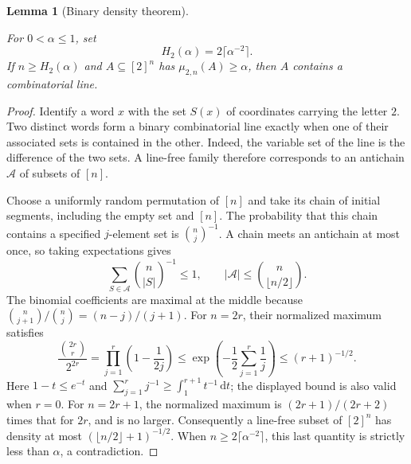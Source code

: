\documentclass[11pt]{amsart}
\newcommand{\dd}{\,\mathrm d}
\newtheorem{lemma}[theorem]{Lemma}
\theoremstyle{definition}
\theoremstyle{remark}
\numberwithin{equation}{section}
\providecommand{\lean}[1]{}
\providecommand{\leanok}{}
\begin{document}
\begin{lemma}[Binary density theorem]\label{cj:binary}
\lean{Auto.C_cj_binary,Auto.cj_binary}
\leanok
For $0<\alpha\le1$, set
\[
 H_2(\alpha)=2\lceil\alpha^{-2}\rceil.
\]
If $n\ge H_2(\alpha)$ and $A\subseteq[2]^n$ has
$\mu_{2,n}(A)\ge\alpha$, then $A$ contains a combinatorial line.
\end{lemma}
\begin{proof}
Identify a word $x$ with the set $S(x)$ of coordinates carrying the
letter $2$.  Two distinct words form a binary combinatorial line
exactly when one of their associated sets is contained in the other.
Indeed, the variable set of the line is the difference of the two
sets.  A line-free family therefore corresponds to an antichain
$\mathcal A$ of subsets of $[n]$.

Choose a uniformly random permutation of $[n]$ and take its chain of
initial segments, including the empty set and $[n]$.  The probability
that this chain contains a specified $j$-element set is
$\binom nj^{-1}$.  A chain meets an antichain at most once, so taking
expectations gives
\[
 \sum_{S\in\mathcal A}\binom n{|S|}^{-1}\le1,
 \qquad
 |\mathcal A|\le\binom n{\lfloor n/2\rfloor}.
\]
The binomial coefficients are maximal at the middle because
$\binom n{j+1}/\binom nj=(n-j)/(j+1)$.
For $n=2r$, their normalized maximum satisfies
\[
 \frac{\binom{2r}r}{2^{2r}}
 =\prod_{j=1}^r\left(1-\frac1{2j}\right)
 \le \exp\left(-\frac12\sum_{j=1}^r\frac1j\right)
 \le(r+1)^{-1/2}.
\]
Here $1-t\le e^{-t}$ and
$\sum_{j=1}^r j^{-1}\ge\int_1^{r+1}t^{-1}\dd t$; the displayed
bound is also valid when $r=0$.  For $n=2r+1$, the normalized maximum
is $(2r+1)/(2r+2)$ times that for $2r$, and is no larger.
Consequently a line-free subset of $[2]^n$ has density at most
$(\lfloor n/2\rfloor+1)^{-1/2}$.  When
$n\ge2\lceil\alpha^{-2}\rceil$, this last quantity is strictly less
than $\alpha$, a contradiction.
\end{proof}
\end{document}
